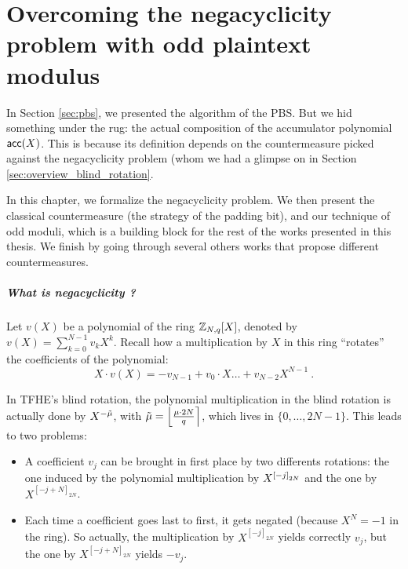 
\chapter{Overcoming the negacyclicity problem with odd plaintext modulus}
\label{chap:negacyclicity}

In Section \ref{sec:pbs}, we presented the algorithm of the PBS. But we hid something under the rug: the actual composition of the accumulator polynomial $\textsf{acc}(X)$. This is because its definition depends on the countermeasure picked against the negacyclicity problem (whom we had a glimpse on  in Section \ref{sec:overview_blind_rotation}. 


In this chapter, we formalize the negacyclicity problem. We then present the classical countermeasure (the strategy of the padding bit), and our technique of odd moduli, which is a building block for the rest of the works presented in this thesis. We finish by going through several others works that propose different countermeasures.




\paragraph{What is negacyclicity ?}


Let $v(X)$ be a polynomial of the ring $\mathbb{Z}_{N,q}[X]$, denoted by $v(X) = \sum_{k=0}^{N-1} v_k X^k$. Recall how a multiplication by $X$  in this ring ``rotates'' the coefficients of the polynomial: \[X \cdot v(X) = - v_{N - 1} + v_0 \cdot X \dots + v_{N - 2} X^{N - 1}~.\]

In TFHE's blind rotation, the polynomial multiplication in the blind rotation is actually done by $X^{-\Tilde{\mu}}$, with $\Tilde{\mu} = \left \lfloor \frac{\mu \cdot 2N}{q} \right \rceil$, which lives in $\{0, \dots, 2N - 1\}$. This leads to two problems:

\begin{itemize}
	\item A coefficient $v_j$ can be brought in first place by two differents rotations: the one induced by the polynomial multiplication by $X^{\left [ -j \right ]_{2N}}$ and the one by $X^{[-j + N]_{2N}}$.
	\item Each time a coefficient goes last to first, it gets negated (because $X^N = -1$ in the ring). So actually, the multiplication by $X^{[-j]_{2N}}$ yields correctly $v_j$, but the one by $X^{[-j + N]_{2N}}$ yields $-v_j$.
\end{itemize}


